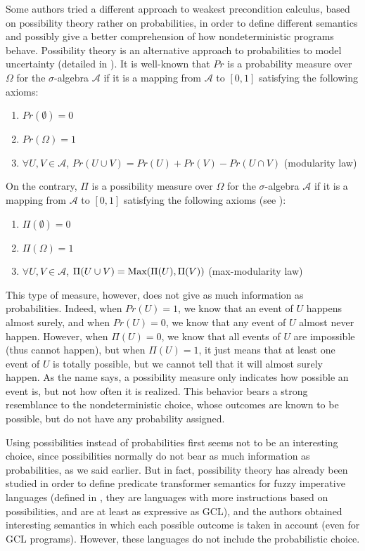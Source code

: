 \documentclass[a4paper,10pt]{llncs}
\def\Max {\textnormal {Max}}
\begin{document}
Some authors \cite{WuChen08,WuChen11,WuChen12} tried a different approach to weakest precondition calculus, based on possibility theory rather on probabilities, in order to define different semantics and possibly give a better comprehension of how nondeterministic programs behave.
Possibility theory is an alternative approach to probabilities to model uncertainty (detailed in \cite{Agarwal15,Shapiro09}). It is well-known that $Pr$ is a probability measure over $\Omega$ for the $\sigma$-algebra $\mathcal{A}$ if it is a mapping from $\mathcal{A}$ to $[0,1]$ satisfying the following axioms:
\begin{enumerate}
\item $Pr(\emptyset) = 0$
\item $Pr(\Omega) = 1$
\item $\forall U,V \in \mathcal{A}$, $Pr(U \cup V) = Pr(U) + Pr(V) - Pr(U \cap V)$ (modularity law)
\end{enumerate}
On the contrary, $\Pi$ is a possibility measure over $\Omega$ for the $\sigma$-algebra $\mathcal{A}$ if it is a mapping from $\mathcal{A}$ to $[0,1]$ satisfying the following axioms (see \cite{Agarwal15,Shapiro09} ):
\begin{enumerate}
\item $\Pi(\emptyset) = 0$
\item $\Pi(\Omega) = 1$
\item $\forall U,V \in \mathcal{A}$, $\Pi(U \cup V) = \Max( \Pi(U), \Pi(V))$ (max-modularity law)
\end{enumerate}
This type of measure, however, does not give as much information as probabilities. Indeed, when $Pr(U) = 1$, we know that an event of $U$ happens almost surely, and when $Pr(U) = 0$, we know that any event of $U$ almost never happen. However, when $\Pi(U) = 0$, we know that all events of $U$ are impossible (thus cannot happen), but when $\Pi(U) = 1$, it just means that at least one event of $U$ is totally possible, but we cannot tell that it will almost surely happen. As the name says, a possibility measure only indicates how possible an event is, but not how often it is realized. This behavior bears a strong resemblance to the nondeterministic choice, whose outcomes are known to be possible, but do not have any probability assigned. \bigskip

Using possibilities instead of probabilities first seems not to be an interesting choice, since possibilities normally do not bear as much information as probabilities, as we said earlier. But in fact, possibility theory has already been studied \cite{WuChen08,WuChen11,WuChen12} in order to define predicate transformer semantics for fuzzy imperative languages (defined in \cite{Bueno93,Bueno97}, they are languages with more instructions based on possibilities, and are at least as expressive as GCL), and the authors obtained interesting semantics in which each possible outcome is taken in account (even for GCL programs). However, these languages do not include the probabilistic choice.\bigskip
\end{document}
